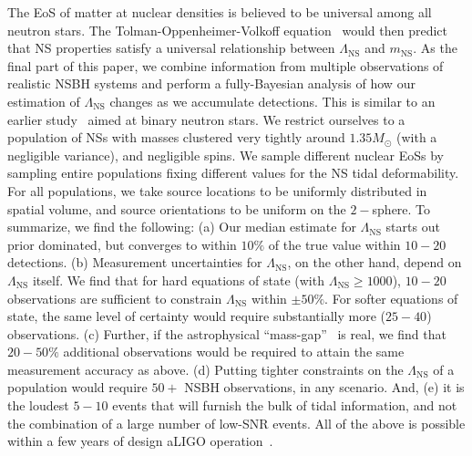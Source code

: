 \documentclass[aps,prd,amsmath,floats,floatfix, twocolumn,
superscriptaddress,nofootinbib,showpacs]{revtex4-1}
\newcommand{\lambdans}{\Lambda_\mathrm{NS}}
\newcommand{\mns}{m_\mathrm{NS}}
\begin{document}
The EoS of matter at nuclear densities is believed to be universal among all
neutron stars. The Tolman-Oppenheimer-Volkoff equation~\cite{Tolman:1939jz,
Oppenheimer:1939ne,1934PNAS...20..169T}
would then predict that NS properties satisfy a universal relationship
between $\lambdans$ and $\mns$. As the final part of
this paper, we combine information from multiple observations of realistic NSBH
systems and perform a fully-Bayesian analysis of how our estimation of
$\lambdans$ changes as we accumulate detections. This is similar to an earlier
study~\cite{DelPozzo:13} aimed at binary neutron stars.
We restrict ourselves to a population of NSs with masses clustered very tightly
around $1.35M_\odot$ (with a negligible variance), and negligible spins. We
sample different nuclear EoSs by sampling entire populations fixing different
values for the NS tidal deformability.
For all populations, we take source locations to be uniformly distributed in
spatial volume, and source orientations to be uniform on the $2-$sphere. To
summarize, we find the following:
% 
(a) Our median estimate for $\lambdans$ starts out prior dominated, but 
converges to within $10\%$ of the true value within $10-20$ detections.
(b) Measurement uncertainties for $\lambdans$, on the other hand, depend on
$\lambdans$ itself. We find that for hard equations of state (with 
$\lambdans\geq 1000$), $10-20$ observations are sufficient to constrain
$\lambdans$ within $\pm 50\%$. For softer equations of state, the same level
of certainty would require substantially more ($25-40$) observations.
% 
(c) Further, if the astrophysical ``mass-gap''~\cite{Bailyn:1997xt,
Kalogera:1996ci,Kreidberg:2012,Littenberg:2015tpa} is real, we find that $20-50\%$
additional observations would be required to attain the same measurement
accuracy as above. (d) Putting tighter constraints on the $\lambdans$ of a
population would require $50+$ NSBH observations, in any scenario.
And, (e) it is the loudest $5-10$ events that will furnish the bulk
of tidal information, and not the combination of a large number of 
low-SNR events.
% 
All of the above is possible within a few years of design
aLIGO operation~\cite{Abadie:2010cfa}.
\end{document}
